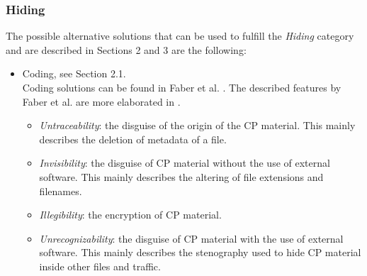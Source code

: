 \documentclass{sig-alternate-br}
\begin{document}
\subsubsection{Hiding}
The possible alternative solutions that can be used to fulfill the \textit{Hiding} category and are described in Sections 2 and 3 are the following:
\begin{itemize}
	\item Coding, see Section 2.1.\\
		Coding solutions can be found in Faber et al. \cite{en2011phishing}. The described features by Faber et al. are more elaborated in \cite{wortley2006child, jenkins2001beyond,wolak2005child}.
		\begin{itemize}
			\item \textit{Untraceability}: the disguise of the origin of the CP material. This mainly describes the deletion of metadata of a file.
			\item \textit{Invisibility}: the disguise of CP material without the use of external software. This mainly describes the altering of file extensions and filenames.
			\item \textit{Illegibility}: the encryption of CP material.
			\item \textit{Unrecognizability}: the disguise of CP material with the use of external software. This mainly describes the stenography used to hide CP material inside other files and traffic.
		\end{itemize}
\end{itemize}
\end{document}
